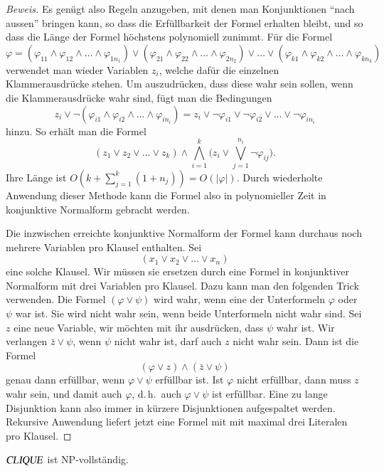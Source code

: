 \begin{proof}[Beweis]
Es genügt also Regeln anzugeben, mit denen man Konjunktionen
``nach aussen'' bringen kann, so dass die Erfüllbarkeit der
Formel erhalten bleibt, und so dass die Länge der Formel 
höchstens polynomiell zunimmt. Für die Formel
\[
\varphi=
(
\varphi_{11}
\wedge
\varphi_{12}
\wedge
\dots
\wedge
\varphi_{1n_1}
)
\vee
(
\varphi_{21}
\wedge
\varphi_{22}
\wedge
\dots
\wedge
\varphi_{2n_2}
)
\vee\dots\vee
(
\varphi_{k1}
\wedge
\varphi_{k2}
\wedge
\dots
\wedge
\varphi_{kn_k}
)
\]
verwendet man wieder Variablen $z_i$, welche dafür die einzelnen
Klammerausdrücke stehen. Um auszudrücken, dass diese wahr sein
sollen, wenn die Klammerausdrücke wahr sind, fügt man
die Bedingungen
\[
z_i\vee \neg
(
\varphi_{i1}
\wedge
\varphi_{i2}
\wedge
\dots
\wedge
\varphi_{in_i}
)
=
z_i\vee
\neg\varphi_{i1}
\vee
\neg\varphi_{i2}
\vee
\dots
\vee
\neg\varphi_{in_i}
\]
hinzu. So erhält man die Formel
\[
(z_1\vee z_2\vee \dots\vee z_k)
\wedge
\bigwedge_{i=1}^k \biggl(z_i\vee \bigvee_{j=1}^{n_i} \neg\varphi_{ij}\biggr).
\]
Ihre Länge ist $O(k+\sum_{j=1}^k(1+n_j))=O(|\varphi|)$.
Durch wiederholte Anwendung dieser Methode kann die
Formel also in polynomieller Zeit in konjunktive Normalform gebracht
werden.

Die inzwischen erreichte konjunktive Normalform der Formel kann durchaus
noch mehrere Variablen pro Klausel enthalten. Sei 
\[
(x_1\vee x_2\vee \dots\vee x_n)
\]
eine solche Klausel.
Wir müssen sie ersetzen durch eine
Formel in konjunktiver Normalform mit drei Variablen pro Klausel.
Dazu kann man den folgenden Trick verwenden.
Die Formel $(\varphi\vee\psi)$ wird wahr, wenn eine der Unterformeln
$\varphi$ oder $\psi$ war ist. Sie wird nicht wahr sein, wenn 
beide Unterformeln nicht wahr sind. Sei $z$ eine neue Variable,
wir möchten mit ihr ausdrücken, dass $\psi$ wahr ist. Wir
verlangen $\bar z \vee \psi$, wenn $\psi$ nicht wahr ist, darf auch $z$
nicht wahr sein. Dann ist die Formel
\[
(\varphi \vee z)\wedge(\bar z\vee \psi)
\]
genau dann erfüllbar, wenn $\varphi\vee \psi$ erfüllbar ist.
Ist $\varphi$ nicht erfüllbar, dann muss $z$ wahr sein, und
damit auch $\varphi$, d.\,h.~auch $\varphi\vee\psi$ ist erfüllbar.
Eine zu lange Disjunktion kann also immer in kürzere Disjunktionen 
aufgespaltet werden. Rekursive Anwendung liefert jetzt eine Formel
mit mit maximal drei Literalen pro Klausel.
\end{proof}

\begin{satz}
$\text{\textsl{CLIQUE}}$ ist NP-vollständig.
\end{satz}

